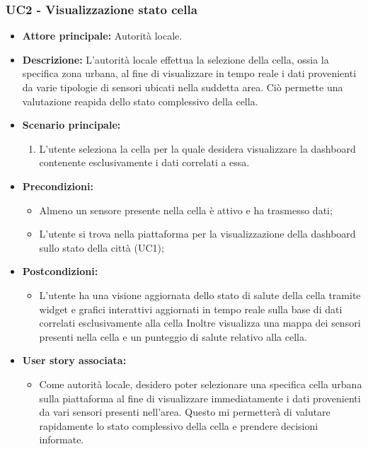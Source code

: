 \subsubsection{UC2 - Visualizzazione stato cella}
\begin{itemize}
    \item \textbf{Attore principale:} Autorità locale.
    \item \textbf{Descrizione:} L'autorità locale effettua la selezione della cella, ossia la specifica zona urbana, al fine di visualizzare in tempo reale i dati provenienti da varie tipologie di sensori ubicati nella suddetta area. Ciò permette una valutazione reapida dello stato complessivo della cella.
    \item \textbf{Scenario principale:}
          \begin{enumerate}
              \item L'utente seleziona la cella per la quale desidera visualizzare la dashboard contenente esclusivamente i dati correlati a essa.
          \end{enumerate}
    \item \textbf{Precondizioni:}
          \begin{itemize}
              \item  Almeno un sensore presente nella cella è attivo e ha trasmesso dati;
              \item L'utente si trova  nella piattaforma per la visualizzazione della dashboard sullo stato della città (UC1);
          \end{itemize}
    \item \textbf{Postcondizioni:}
          \begin{itemize}
              \item  L'utente ha una visione aggiornata dello stato di salute della cella tramite widget e grafici interattivi aggiornati in tempo reale sulla base di dati correlati esclusivamente alla cella
                    Inoltre visualizza una mappa dei sensori presenti nella cella e un punteggio di salute relativo alla cella.
          \end{itemize}
    \item \textbf{User story associata:}
          \begin{itemize}
              \item Come autorità locale, desidero poter selezionare una specifica cella urbana sulla piattaforma al fine di visualizzare immediatamente i dati provenienti da vari sensori presenti nell'area. Questo mi permetterà di valutare rapidamente lo stato complessivo della cella e prendere decisioni informate.
          \end{itemize}
\end{itemize}